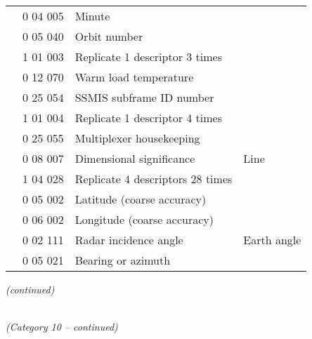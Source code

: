 \begin{longtable}[]{@{}llll@{}}
& 0 04 005 & Minute &\tabularnewline
& 0 05 040 & Orbit number &\tabularnewline
& 1 01 003 & Replicate 1 descriptor 3 times &\tabularnewline
& 0 12 070 & Warm load temperature &\tabularnewline
& 0 25 054 & SSMIS subframe ID number &\tabularnewline
& 1 01 004 & Replicate 1 descriptor 4 times &\tabularnewline
& 0 25 055 & Multiplexer housekeeping &\tabularnewline
& 0 08 007 & Dimensional significance & Line\tabularnewline
& 1 04 028 & Replicate 4 descriptors 28 times &\tabularnewline
& 0 05 002 & Latitude (coarse accuracy) &\tabularnewline
& 0 06 002 & Longitude (coarse accuracy) &\tabularnewline
& 0 02 111 & Radar incidence angle & Earth angle\tabularnewline
& 0 05 021 & Bearing or azimuth &\tabularnewline
\bottomrule
\end{longtable}

\emph{(continued)}

\emph{\\
(Category 10 -- continued)}

